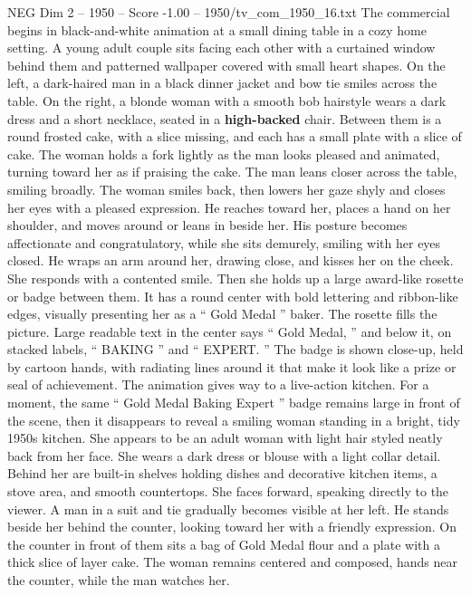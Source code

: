 \begin{textsample}{NEG Dim 2 – 1950 – Score -1.00 – 1950/tv\_com\_1950\_16.txt}  \label{ex:f2_neg_001}
The commercial begins in black-and-white animation at a small dining table in a cozy home setting.
A young adult couple sits facing each other with a curtained window behind them and patterned wallpaper covered with small heart shapes.
On the left, a dark-haired man in a black dinner jacket and bow tie smiles across the table.
On the right, a blonde woman with a smooth bob hairstyle wears a dark dress and a short necklace, seated in a \textbf{high-backed} chair.
Between them is a round frosted cake, with a slice missing, and each has a small plate with a slice of cake.
The woman holds a fork lightly as the man looks pleased and animated, turning toward her as if praising the cake.
The man leans closer across the table, smiling broadly.
The woman smiles back, then lowers her gaze shyly and closes her eyes with a pleased expression.
He reaches toward her, places a hand on her shoulder, and moves around or leans in beside her.
His posture becomes affectionate and congratulatory, while she sits demurely, smiling with her eyes closed.
He wraps an arm around her, drawing close, and kisses her on the cheek.
She responds with a contented smile.
Then she holds up a large award-like rosette or badge between them.
It has a round center with bold lettering and ribbon-like edges, visually presenting her as a “ Gold Medal ” baker.
The rosette fills the picture.
Large readable text in the center says “ Gold Medal, ” and below it, on stacked labels, “ BAKING ” and “ EXPERT. ” The badge is shown close-up, held by cartoon hands, with radiating lines around it that make it look like a prize or seal of achievement.
The animation gives way to a live-action kitchen.
For a moment, the same “ Gold Medal Baking Expert ” badge remains large in front of the scene, then it disappears to reveal a smiling woman standing in a bright, tidy 1950s kitchen.
She appears to be an adult woman with light hair styled neatly back from her face.
She wears a dark dress or blouse with a light collar detail.
Behind her are built-in shelves holding dishes and decorative kitchen items, a stove area, and smooth countertops.
She faces forward, speaking directly to the viewer.
A man in a suit and tie gradually becomes visible at her left.
He stands beside her behind the counter, looking toward her with a friendly expression.
On the counter in front of them sits a bag of Gold Medal flour and a plate with a thick slice of layer cake.
The woman remains centered and composed, hands near the counter, while the man watches her.

\end{textsample}
